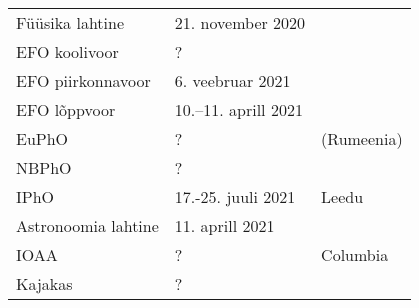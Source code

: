 \documentclass[a4paper,11pt,twocolumn]{article}
\begin{document}
\begin{tabular}{l l l}
    Füüsika lahtine & 21. november 2020 \\
    EFO koolivoor & ? \\
    EFO piirkonnavoor & 6. veebruar 2021 \\
    EFO lõppvoor & 10.--11. aprill 2021 \\
    EuPhO & ? & (Rumeenia)\\
    NBPhO & ?\\
    IPhO & 17.-25. juuli 2021 & Leedu\\
    Astronoomia lahtine & 11. aprill 2021 \\
    IOAA & ? & Columbia\\
    Kajakas & ? \\
\end{tabular}
\end{document}
